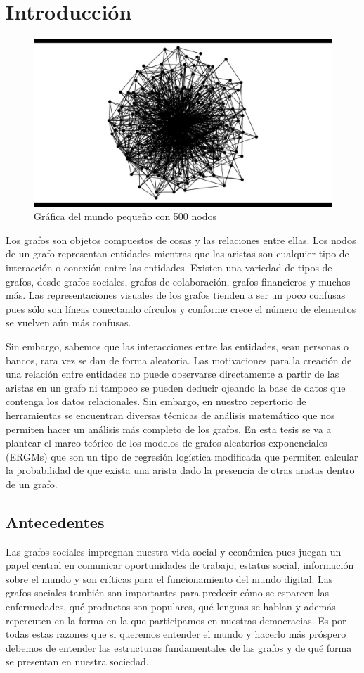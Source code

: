 \chapter{Introducción}


\begin{figure}
    \includegraphics[width=.5\textwidth]{Tesis/Figures/smallworld.jpg}
    \caption{Gráfica del mundo pequeño con 500 nodos}
\end{figure}

Los grafos son objetos compuestos de cosas y las relaciones entre ellas. Los nodos de un grafo representan entidades mientras que las aristas son cualquier tipo de interacción o conexión entre las entidades. Existen una variedad de tipos de grafos, desde grafos sociales, grafos de colaboración, grafos financieros y muchos más. Las representaciones visuales de los grafos tienden a ser un poco confusas pues sólo son líneas conectando círculos y conforme crece el número de elementos se vuelven aún más confusas.

Sin embargo, sabemos que las interacciones entre las entidades, sean personas o bancos, rara vez se dan de forma aleatoria. Las motivaciones para la creación de una relación entre entidades no puede observarse directamente a partir de las aristas en un grafo ni tampoco se pueden deducir ojeando la base de datos que contenga los datos relacionales. Sin embargo, en nuestro repertorio de herramientas se encuentran diversas técnicas de análisis matemático que nos permiten hacer un análisis más completo de los grafos. En esta tesis se va a plantear el marco teórico de los modelos de grafos aleatorios exponenciales (ERGMs) que son un tipo de regresión logística modificada que permiten calcular la probabilidad de que exista una arista dado la presencia de otras aristas dentro de un grafo.


\section{Antecedentes}

Las grafos sociales impregnan nuestra vida social y económica pues juegan un papel central en comunicar oportunidades de trabajo, estatus social, información sobre el mundo y son críticas para el funcionamiento del mundo digital. Las grafos sociales también son importantes para predecir cómo se esparcen las enfermedades, qué productos son populares, qué lenguas se hablan y además repercuten en la forma en la que participamos en nuestras democracias. Es por todas estas razones que si queremos entender el mundo y hacerlo más próspero debemos de entender las estructuras fundamentales de las grafos y de qué forma se presentan en nuestra sociedad.

